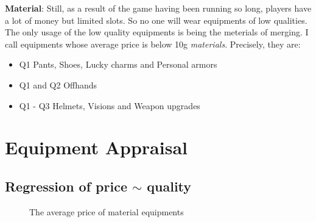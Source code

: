 \documentclass{manuscript}
\begin{document}
    \textbf{Material}: Still, as a result of the game having been running so long, players have a lot of money but limited
    slots. So no one will wear equipments of low qualities. The only usage of the low quality equipments is being the
    meterials of merging. I call equipments whose average price is below 10g \textit{materials}. Precisely, they are:
    \begin{itemize}[nosep]
        \item Q1 Pants, Shoes, Lucky charms and Personal armors
        \item Q1 and Q2 Offhands
        \item Q1 - Q3 Helmets, Visions and Weapon upgrades
    \end{itemize}

    \section{Equipment Appraisal}

    \subsection{Regression of price $\sim$ quality}

    \begin{figure}[h]
        \centering
        
        \caption{The average price of material equipments}\label{fig:reg1}
    \end{figure}
\end{document}
